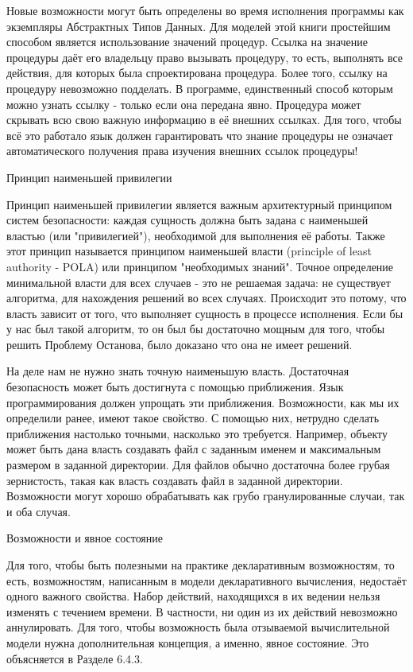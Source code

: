 Новые возможности могут быть определены во время исполнения программы как экземпляры Абстрактных Типов Данных. Для моделей этой книги простейшим способом является использование значений процедур. Ссылка на значение процедуры даёт его владельцу право вызывать процедуру, то есть, выполнять все действия, для которых была спроектирована процедура. Более того, ссылку на процедуру невозможно подделать. В программе, единственный способ которым можно узнать ссылку - только если она передана явно. Процедура может скрывать всю свою важную информацию в её внешних ссылках. Для того, чтобы всё это работало язык должен гарантировать что знание процедуры не означает автоматического получения права изучения внешних ссылок процедуры!

Принцип наименьшей привилегии

Принцип наименьшей привилегии является важным архитектурный принципом систем безопасности: каждая сущность должна быть задана с наименьшей властью (или "привилегией"), необходимой для выполнения её работы. Также этот принцип называется принципом наименьшей власти (principle of least authority - POLA) или принципом "необходимых знаний". Точное определение минимальной власти для всех случаев - это не решаемая задача: не существует алгоритма, для нахождения решений во всех случаях. Происходит это потому, что власть зависит от того, что выполняет сущность в процессе исполнения. Если бы у нас был такой алгоритм, то он был бы достаточно мощным для того, чтобы решить Проблему Останова, было доказано что она не имеет решений.

На деле нам не нужно знать точную наименьшую власть. Достаточная безопасность может быть достигнута с помощью приближения. Язык программирования должен упрощать эти приближения. Возможности, как мы их определили ранее, имеют такое свойство. С помощью них, нетрудно сделать приближения настолько точными, насколько это требуется. Например, объекту может быть дана власть создавать файл с заданным именем и максимальным размером в заданной директории. Для файлов обычно достаточна более грубая зернистость, такая как власть создавать файл в заданной директории. Возможности могут хорошо обрабатывать как грубо гранулированные случаи, так и оба случая.

Возможности и явное состояние

Для того, чтобы быть полезными на практике декларативным возможностям, то есть, возможностям, написанным в модели декларативного вычисления, недостаёт одного важного свойства. Набор действий, находящихся в их ведении нельзя изменять с течением времени. В частности, ни один из их действий невозможно аннулировать. Для того, чтобы возможность была отзываемой вычислительной модели нужна дополнительная концепция, а именно, явное состояние. Это объясняется в Разделе 6.4.3.

